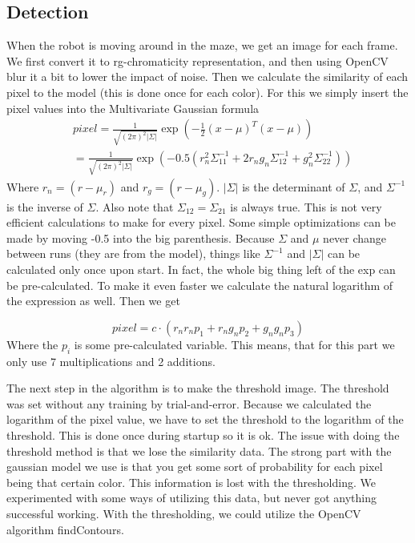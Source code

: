 \subsection{Detection}
When the robot is moving around in the maze, we get an image for each frame. We
first convert it to rg-chromaticity representation, and then using OpenCV blur
it a bit to lower the impact of noise. Then we calculate the similarity of each
pixel to the model (this is done once for each color). For this we simply insert
the pixel values into the Multivariate Gaussian formula
\begin{align}
  &pixel=\frac{1}{\sqrt{(2\pi)^2|\Sigma|}}\exp\left(-\frac{1}{2}(x-\mu)^T(x-\mu)\right)\\
  &  =\frac{1}{\sqrt{(2\pi)^2|\Sigma|}}\exp\left(-0.5(r_n^2\Sigma_{11}^{-1}+2r_ng_n\Sigma_{12}^{-1}+g_n^2\Sigma_{22}^{-1})\right)
\end{align}
Where $r_n= (r-\mu_r)$ and $r_g= (r-\mu_g)$. $|\Sigma|$ is the determinant of
$\Sigma$, and $\Sigma^{-1}$ is the inverse of $\Sigma$. Also note that
$\Sigma_{12}= \Sigma_{21}$ is always true. This is not very efficient
calculations to make for every pixel. Some simple optimizations can be made by
moving -0.5 into the big parenthesis. Because $\Sigma$ and $\mu$ never change
between runs (they are from the model), things like $\Sigma^{-1}$ and $|\Sigma|$
can be calculated only once upon start. In fact, the whole big thing left of the
exp can be pre-calculated. To make it even faster we calculate the natural
logarithm of the expression as well. Then we get

\begin{equation}
  pixel=c\cdot(r_nr_np_1+r_ng_np_2+g_ng_np_3)
\end{equation}
Where the $p_i$ is some pre-calculated variable. This means, that for this part
we only use 7 multiplications and 2 additions.

The next step in the algorithm is to make the threshold image. The threshold was
set without any training by trial-and-error. Because we calculated the logarithm
of the pixel value, we have to set the threshold to the logarithm of the
threshold. This is done once during startup so it is ok. The issue with doing
the threshold method is that we lose the similarity data. The strong part with
the gaussian model we use is that you get some sort of probability for each
pixel being that certain color. This information is lost with the thresholding.
We experimented with some ways of utilizing this data, but never got anything
successful working. With the thresholding, we could utilize the OpenCV algorithm
findContours.


